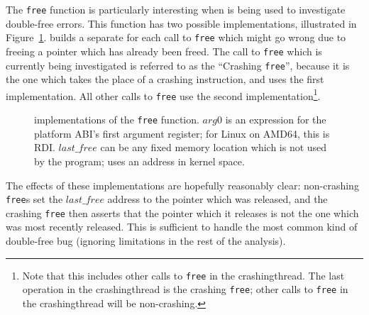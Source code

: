  The \texttt{free} function is particularly
interesting when {\technique} is being used to investigate double-free
errors.  This function has two possible implementations, illustrated
in Figure~\ref{fig:library_free}.  {\Technique} builds a separate
{\StateMachine} for each call to \texttt{free} which might go wrong
due to freeing a pointer which has already been freed.  The call to
\texttt{free} which is currently being investigated is referred to as
the ``Crashing \texttt{free}'', because it is the one which takes the
place of a crashing instruction, and uses the first implementation.
All other calls to \texttt{free} use the second
implementation\footnote{Note that this includes other calls to
  \texttt{free} in the \gls{crashingthread}.  The last operation
  in the \gls{crashingthread} is the crashing \texttt{free};
  other calls to \texttt{free} in the \gls{crashingthread} will
  be non-crashing.}.

\begin{figure}

  \caption{{\StateMachine} implementations of the \texttt{free}
    function. $arg0$ is an expression for the platform ABI's first
    argument register; for Linux on AMD64, this is RDI.
    $\mathit{last\_free}$ can be any fixed memory location which is
    not used by the program; {\implementation} uses an address in
    kernel space.}
  \label{fig:library_free}
\end{figure}

The effects of these implementations are hopefully reasonably clear:
non-crashing \texttt{free}s set the $\mathit{last\_free}$ address to
the pointer which was released, and the crashing \texttt{free} then
asserts that the pointer which it releases is not the one which was
most recently released.  This is sufficient to handle the most common
kind of double-free bug (ignoring limitations in the rest of the
analysis).  

